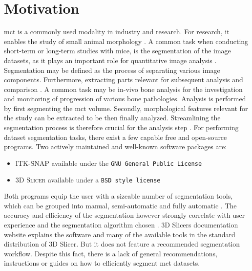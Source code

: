 \section{Motivation}\label{s:introduction-motivation}
\acrfull{mct} is a commonly used modality in industry and research.
For research, it enables the study of small animal morphology \cite{percianoInsight3DMicroCT2017}.
A common task when conducting short-term or long-term studies with mice, is the segmentation of the image datasets, as it plays an important role for quantitative image analysis \cite{sheppardTechniquesHelicalScanning2014}.
Segmentation may be defined as the process of separating various image components.
Furthermore, extracting parts relevant for subsequent analysis and comparison \cite{percianoInsight3DMicroCT2017}.
A common task may be in-vivo bone analysis for the investigation and monitoring of progression of various bone pathologies.
Analysis is performed by first segmenting the \acrshort{mct} volume.
Secondly, morphological features relevant for the study can be extracted to be then finally analyzed.
Streamlining the segmentation process is therefore crucial for the analysis step \cite{percianoInsight3DMicroCT2017,korfiatisIndependentActiveContours2017}.
\newline
For performing \mct\space dataset segmentation tasks, there exist a few capable free and open-source programs.
Two actively maintained and well-known \cite{virziComprehensiveReview3D2020,mandoliniComparisonThree3D2022,virziComprehensiveReview3D2020} software packages are:
\begin{itemize}
	\item \textsc{ITK-SNAP} \cite{yushkevichUserguided3DActive2006} available under the \texttt{GNU General Public License} \cite{licenseGnuGeneralPublic1989}
	\item \textsc{3D Slicer} \cite{kikinis3DSlicerPlatform2014} available under a \texttt{BSD style license} \cite{gaudeulPublicProvisionPrivate2005}
\end{itemize}
Both programs equip the user with a sizeable number of segmentation tools, which can be grouped into manual, semi-automatic and fully automatic \cite{percianoInsight3DMicroCT2017}.
The accuracy and efficiency of the segmentation however strongly correlate with user experience and the segmentation algorithm chosen \cite{mandoliniComparisonThree3D2022,aydinRELIABILITYREPRODUCIBILITYTIMEEFFICIENCY2020,arguelloComparisonSegmentationTools2019}.
3D Slicers documentation website \cite{pinterPolymorphSegmentationRepresentation2019} explains the software and many of the available tools in the standard distribution of 3D Slicer.
But it does not feature a recommended segmentation workflow.
Despite this fact, there is a lack of general recommendations, instructions or guides on how to efficiently segment \acrlong{mct} datasets.

